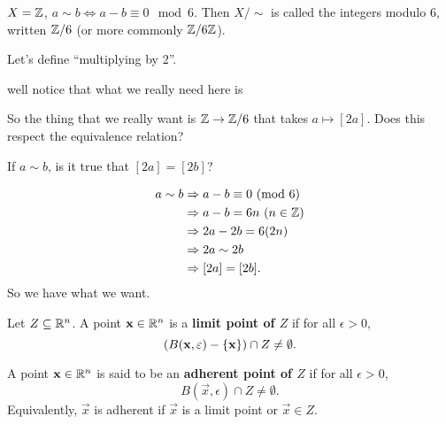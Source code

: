 \documentclass[12pt, twosided]{article}
\begin{document}
\begin{exa}
  \(X = \mathbb{Z}\), \(a \sim b \Leftrightarrow a-b \equiv 0 \mod{6}\). Then \(X/\sim\) is called the integers modulo 6, written \(\mathbb{Z}/6\) (or more commonly \(\mathbb{Z}/6\mathbb{Z}\)).

  Let's define ``multiplying by 2''.

  \begin{center}
  \end{center}

  well notice that what we really need here is
  \begin{center}
  \end{center}

  So the thing that we really want is \(\mathbb{Z} \to \mathbb{Z}/6\) that takes \(a \mapsto [2a]\). Does this respect the equivalence relation?

  If \(a \sim b\), is it true that \([2a] = [2b]\)?

  \begin{align*}
    a \sim b &\Rightarrow a-b \equiv 0 \ (\mathrm{mod}\ 6) \\
             &\Rightarrow a - b = 6n\ (n \in \mathbb{Z}) \\
             &\Rightarrow 2a -2b = 6(2n) \\
             &\Rightarrow 2a \sim 2b \\
             &\Rightarrow [2a] = [2b].
  \end{align*}
  So we have what we want.
  
\end{exa}


\begin{df}
  Let \(Z \subseteq \mathbb{R}^n\). A point \(\mathbf{x} \in \mathbb{R}^n\) is a \textbf{limit point of \(Z\)} if for all \(\epsilon > 0\), \[(B(\mathbf{x}, \varepsilon) - \left\{ \mathbf{x} \right\}) \cap Z \neq \emptyset.\]

  A point \(\mathbf{x} \in \mathbb{R}^n\) is said to be an \textbf{adherent point of \(Z\)} if for all \(\epsilon > 0\), \[B(\vec{x}, \epsilon) \cap Z \neq \emptyset.\] Equivalently, \(\vec{x}\) is adherent if \(\vec{x}\) is a limit point or \(\vec{x} \in Z\).
\end{df}
\end{document}
